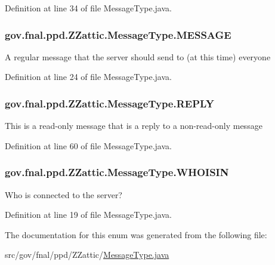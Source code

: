 Definition at line 34 of file Message\-Type.\-java.

\hypertarget{enumgov_1_1fnal_1_1ppd_1_1ZZattic_1_1MessageType_a81039ad567bff174746f349bf501288a}{
\subsubsection[{M\-E\-S\-S\-A\-G\-E}]{\setlength{\rightskip}{0pt plus 5cm}gov.\-fnal.\-ppd.\-Z\-Zattic.\-Message\-Type.\-M\-E\-S\-S\-A\-G\-E}}\label{enumgov_1_1fnal_1_1ppd_1_1ZZattic_1_1MessageType_a81039ad567bff174746f349bf501288a}
A regular message that the server should send to (at this time) everyone 

Definition at line 24 of file Message\-Type.\-java.

\hypertarget{enumgov_1_1fnal_1_1ppd_1_1ZZattic_1_1MessageType_abdccf8a588a0067210be6d65a361ca5e}{
\subsubsection[{R\-E\-P\-L\-Y}]{\setlength{\rightskip}{0pt plus 5cm}gov.\-fnal.\-ppd.\-Z\-Zattic.\-Message\-Type.\-R\-E\-P\-L\-Y}}\label{enumgov_1_1fnal_1_1ppd_1_1ZZattic_1_1MessageType_abdccf8a588a0067210be6d65a361ca5e}
This is a read-\/only message that is a reply to a non-\/read-\/only message 

Definition at line 60 of file Message\-Type.\-java.

\hypertarget{enumgov_1_1fnal_1_1ppd_1_1ZZattic_1_1MessageType_ac55125e923f4785bf34e29bd34d63052}{
\subsubsection[{W\-H\-O\-I\-S\-I\-N}]{\setlength{\rightskip}{0pt plus 5cm}gov.\-fnal.\-ppd.\-Z\-Zattic.\-Message\-Type.\-W\-H\-O\-I\-S\-I\-N}}\label{enumgov_1_1fnal_1_1ppd_1_1ZZattic_1_1MessageType_ac55125e923f4785bf34e29bd34d63052}
Who is connected to the server? 

Definition at line 19 of file Message\-Type.\-java.



The documentation for this enum was generated from the following file\-:\begin{DoxyCompactItemize}
\item 
src/gov/fnal/ppd/\-Z\-Zattic/\hyperlink{MessageType_8java}{Message\-Type.\-java}\end{DoxyCompactItemize}
